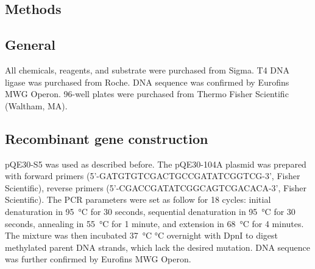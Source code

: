 \begin{refsection}
\section{Methods}

\subsection{General}

All chemicals, reagents, and substrate were purchased from Sigma. T4 DNA ligase
was purchased from Roche. DNA sequence was confirmed by Eurofins MWG Operon.
96-well plates were purchased from Thermo Fisher Scientific (Waltham, MA).

\subsection{Recombinant gene construction}

pQE30-S5 was used as described before. The pQE30-104A plasmid was prepared with
forward primers (5’-GATGTGTCGACTGCCGATATCGGTCG-3’, Fisher Scientific), reverse
primers (5’-CGACCGATATCGGCAGTCGACACA-3’, Fisher Scientific). The PCR parameters
were set as follow for 18 cycles: initial denaturation in \SI{95}{\celsius}
for 30 seconds, sequential denaturation in \SI{95}{\celsius} for 30
seconds, annealing in \SI{55}{\celsius} for 1 minute, and extension in
\SI{68}{\celsius} for 4 minutes. The mixture was then incubated
\SI{37}{\celsius} °C overnight with DpnI to digest methylated parent DNA
strands, which lack the desired mutation. DNA sequence was further confirmed by
Eurofins MWG Operon.


\end{refsection}

